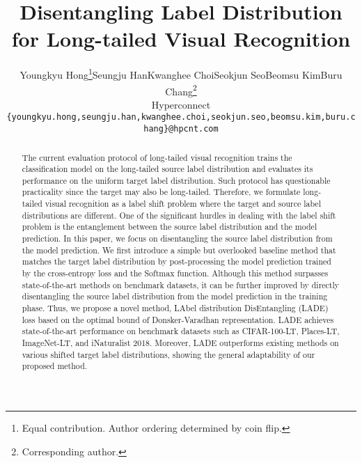 \documentclass[final]{cvpr}
\begin{document}
\title{Disentangling Label Distribution for Long-tailed Visual Recognition}

\author{Youngkyu Hong\thanks{Equal contribution. Author ordering determined by coin flip. }\quad Seungju Han\footnotemark[1]\quad Kwanghee Choi\footnotemark[1]\quad Seokjun Seo\quad Beomsu Kim\quad Buru Chang\thanks{Corresponding author.}\\
Hyperconnect\\
{\tt\small \{youngkyu.hong,seungju.han,kwanghee.choi,seokjun.seo,beomsu.kim,buru.chang\}@hpcnt.com}
}

\maketitle


\begin{abstract}\label{sec:0_abstract}
The current evaluation protocol of long-tailed visual recognition trains the classification model on the long-tailed source label distribution and evaluates its performance on the uniform target label distribution.
Such protocol has questionable practicality since the target may also be long-tailed.
Therefore, we formulate long-tailed visual recognition as a label shift problem where the target and source label distributions are different.
One of the significant hurdles in dealing with the label shift problem is the entanglement between the source label distribution and the model prediction.
In this paper, we focus on disentangling the source label distribution from the model prediction.
We first introduce a simple but overlooked baseline method that matches the target label distribution by post-processing the model prediction trained by the cross-entropy loss and the Softmax function.
Although this method surpasses state-of-the-art methods on benchmark datasets, it can be further improved by directly disentangling the source label distribution from the model prediction in the training phase.
Thus, we propose a novel method, LAbel distribution DisEntangling (LADE) loss based on the optimal bound of Donsker-Varadhan representation.
LADE achieves state-of-the-art performance on benchmark datasets such as CIFAR-100-LT, Places-LT, ImageNet-LT, and iNaturalist 2018.
Moreover, LADE outperforms existing methods on various shifted target label distributions, showing the general adaptability of our proposed method.
\end{abstract} 
\end{document}
